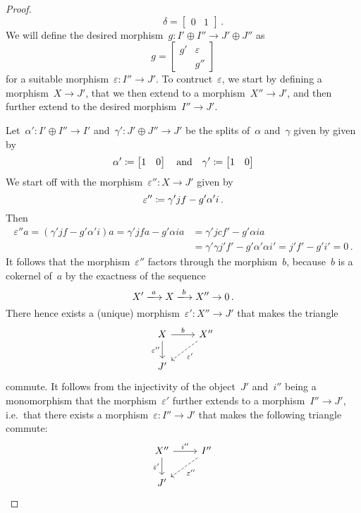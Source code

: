 \begin{proof}
\[    \qquad
    \delta
    =
    \begin{bmatrix}
      0 & 1
    \end{bmatrix} \,.
  \]
  We will define the desired morphism~$g \colon I' \oplus I'' \to J' \oplus J''$ as
  \[
    g
    =
    \begin{bmatrix}
      g'  & \varepsilon \\
          & g''
    \end{bmatrix}
  \]
  for a suitable morphism~$\varepsilon \colon I'' \to J'$.
  To contruct~$\varepsilon$, we start by defining a morphism~$ X \to J'$, that we then extend to a morphism~$X'' \to J'$, and then further extend to the desired morphism~$I'' \to J'$.
  
  Let~$\alpha' \colon I' \oplus I'' \to I'$ and~$\gamma' \colon J' \oplus J'' \to J'$ be the splits of~$\alpha$ and~$\gamma$ given by given by
  \[
    \alpha'
    \coloneqq
    \begin{bmatrix}
      1 & 0
    \end{bmatrix}
    \quad
    \text{and}\quad
    \gamma'
    \coloneqq
    \begin{bmatrix}
      1 & 0
    \end{bmatrix}
  \]
  We start off with the morphism~$\varepsilon'' \colon X \to J'$ given by
  \[
    \varepsilon''
    \coloneqq
    \gamma' j f - g' \alpha' i \,.
  \]
  Then
  \begin{align*}
    \varepsilon'' a
    =
    (\gamma' j f - g' \alpha' i) a
    =
    \gamma' j f a - g' \alpha i a
    &=
    \gamma' j c f' - g' \alpha i a  \\
    &=
    \gamma' \gamma j' f' - g' \alpha' \alpha i'
    =
    j' f' - g' i'
    =
    0 \,.
  \end{align*}
  It follows that the morphism~$\varepsilon''$ factors through the morphism~$b$, because~$b$ is a cokernel of~$a$ by the exactness of the sequence
  \[
    X'
    \xlongto{a}
    X
    \xlongto{b}
    X''
    \to
    0 \,.
  \]
  There hence exists a (unique) morphism~$\varepsilon' \colon X'' \to  J'$ that makes the triangle
  \[
    \begin{tikzcd}
        X
        \arrow{r}[above]{b}
        \arrow{d}[left]{\varepsilon''}
      & X''
        \arrow[dashed]{dl}[below right]{\varepsilon'}
      \\
        J'
      & {}
    \end{tikzcd}
  \]
  commute.
  It follows from the injectivity of the object~$J'$ and~$i''$ being a monomorphism that the morphism~$\varepsilon'$ further extends to a morphism~$I'' \to J'$, i.e.\ that there exists a morphism~$\varepsilon \colon I'' \to J'$ that makes the following triangle commute:
  \[
    \begin{tikzcd}
        X''
        \arrow{r}[above]{i''}
        \arrow{d}[left]{\varepsilon'}
      & I''
        \arrow[dashed]{dl}[below right]{\varepsilon''}
      \\
        J'
      & {}
    \end{tikzcd}
  \]
  

\end{proof}
